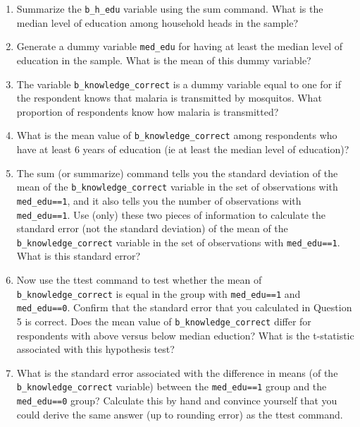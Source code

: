 \documentclass[11pt]{article}
\begin{document}
\begin{enumerate}
	
\item Summarize the \texttt{b\_h\_edu} variable using the sum command.  What is the median 
	level of education among household heads in the sample?


\item Generate a dummy variable \texttt{med\_edu}  for having at least the median level of
	 education in the sample.  What is the mean of this dummy variable?


\item The variable \texttt{b\_knowledge\_correct} is a dummy variable equal to one for 
	if the respondent knows that malaria is transmitted by mosquitos.  
	What proportion of respondents know how malaria is transmitted?


\item What is the mean value of \texttt{b\_knowledge\_correct} among respondents who have 
	at least 6 years of education (ie at least the median level of education)?


\item The sum (or summarize) command tells you the standard deviation of the 
	mean of the \texttt{b\_knowledge\_correct} variable in the set of observations 
	with \texttt{med\_edu==1}, and it also tells you the number of observations with 
	\texttt{med\_edu==1}.  Use (only) these two pieces of information to calculate 
	the standard error (not the standard deviation) of the mean of the 
	\texttt{b\_knowledge\_correct} variable in the set of observations with \texttt{med\_edu==1}.
	What is this standard error?


\item Now use the ttest command to test whether the mean of \texttt{b\_knowledge\_correct} 
	is equal in the group with \texttt{med\_edu==1} and \texttt{med\_edu==0}.  Confirm that the 
	standard error that you calculated in Question 5 is correct.  Does the 
	mean value of \texttt{b\_knowledge\_correct} differ for respondents with above 
	versus below median eduction?  What is the t-statistic associated with 
	this hypothesis test?


\item What is the standard error associated with the difference in means (of 
	the \texttt{b\_knowledge\_correct} variable) between the \texttt{med\_edu==1} group and the 
	\texttt{med\_edu==0} group?  Calculate this by hand and convince yourself that you 
	could derive the same answer (up to rounding error) as the ttest command.



\end{enumerate}
\end{document}
